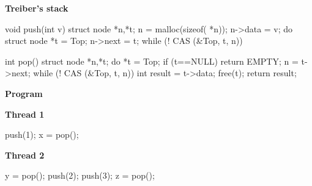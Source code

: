 \begin{figure*}[t]
  \lstset{numbers=left, 
          numberstyle=\tiny\tt, 
          stepnumber=1, 
          firstnumber=1,
          numbersep=4pt}
  \footnotesize
    \lstset{numbers=none}
  \begin{minipage}[t]{50mm}
    {\normalsize \textbf{Treiber's stack}}
    \begin{program}
void push(int v) {
  struct node *n,*t;
  n = malloc(sizeof( *n));
  n->data = v;
  do {
    struct node *t = Top;
    n->next = t;
  } while (! CAS (&Top, t, n))
}

int pop() {
  struct node *n,*t;
  do {
    *t = Top;
    if (t==NULL)
      return EMPTY;
    n = t->next;
  } while (! CAS (&Top, t, n))
  int result = t->data;
  free(t);
  return result;
}
    \end{program}
      {\normalsize \textbf{Program}} \\[1em]
        \begin{minipage}[b]{17mm}
      \textbf{Thread 1}
      \vspace{-1.5mm}
      \begin{program}
push(1);
x = pop();
      \end{program}
      \vspace{6.3mm}
    \end{minipage}
    \begin{minipage}[b]{16mm}
      \textbf{Thread 2}
      \vspace{-1.5mm}
      \begin{program}
y = pop();
push(2);
push(3);
z = pop();
      \end{program}
    \end{minipage}
  \end{minipage}
  \begin{minipage}[t]{43mm}
 \\[1em]
    
  \end{minipage}
  \begin{minipage}[t]{43mm}
 \\[2.5em]
    
  \end{minipage}
  

\end{figure*}
